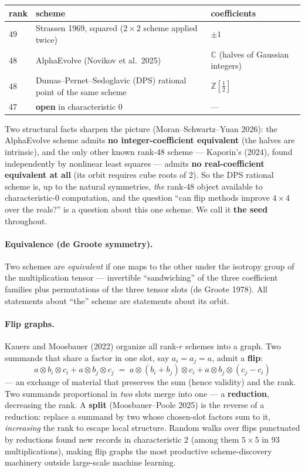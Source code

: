 \documentclass[10pt]{article}
\begin{document}
\begin{center}
\begin{tabular}{@{}lll@{}}
\toprule
rank & scheme & coefficients\\
\midrule
49 & Strassen 1969, squared ($2\times2$ scheme applied twice) & $\pm1$\\
48 & AlphaEvolve (Novikov et al.\ 2025) & $\mathbb{C}$ (halves of Gaussian integers)\\
48 & Dumas--Pernet--Sedoglavic (DPS) rational point of the same scheme & $\mathbb{Z}[\tfrac12]$\\
47 & \textbf{open} in characteristic 0 & ---\\
\bottomrule
\end{tabular}
\end{center}

Two structural facts sharpen the picture (Moran--Schwartz--Yuan 2026):
the AlphaEvolve scheme admits \textbf{no integer-coefficient
equivalent} (the halves are intrinsic), and the only other known
rank-48 scheme --- Kaporin's (2024), found independently by nonlinear
least squares --- admits \textbf{no real-coefficient equivalent at
all} (its orbit requires cube roots of 2). So the DPS rational scheme
is, up to the natural symmetries, \emph{the} rank-48 object available
to characteristic-0 computation, and the question ``can flip methods
improve $4\times4$ over the reals?'' is a question about this one
scheme. We call it \textbf{the seed} throughout.

\paragraph{Equivalence (de Groote symmetry).}
Two schemes are \emph{equivalent} if one maps to the other under the
isotropy group of the multiplication tensor --- invertible
``sandwiching'' of the three coefficient families plus permutations of
the three tensor slots (de Groote 1978). All statements about ``the''
scheme are statements about its orbit.

\paragraph{Flip graphs.}
Kauers and Moosbauer (2022) organize all rank-$r$ schemes into a
graph. Two summands that share a factor in one slot, say
$a_i=a_j=a$, admit a \textbf{flip}:
\[
  a\otimes b_i\otimes c_i + a\otimes b_j\otimes c_j
  \;=\;
  a\otimes(b_i{+}b_j)\otimes c_i + a\otimes b_j\otimes(c_j{-}c_i)
\]
--- an exchange of material that preserves the sum (hence validity)
and the rank. Two summands proportional in \emph{two} slots merge
into one --- a \textbf{reduction}, decreasing the rank. A
\textbf{split} (Moosbauer--Poole 2025) is the reverse of a reduction:
replace a summand by two whose chosen-slot factors sum to it,
\emph{increasing} the rank to escape local structure. Random walks
over flips punctuated by reductions found new records in
characteristic 2 (among them $5\times5$ in 93 multiplications),
making flip graphs the most productive scheme-discovery machinery
outside large-scale machine learning.
\end{document}
